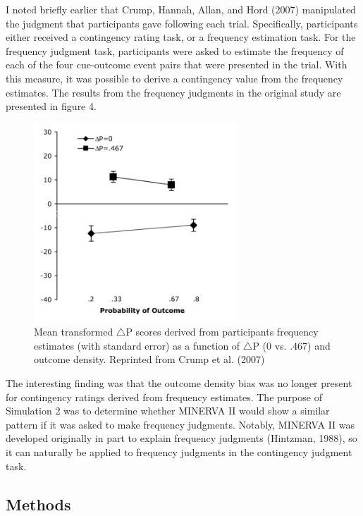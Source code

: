 \documentclass[
  english,
  man,floatsintext]{apa6}
\begin{document}
I noted briefly earlier that Crump, Hannah, Allan, and Hord (2007) manipulated the judgment that participants gave following each trial. Specifically, participants either received a contingency rating task, or a frequency estimation task. For the frequency judgment task, participants were asked to estimate the frequency of each of the four cue-outcome event pairs that were presented in the trial. With this measure, it was possible to derive a contingency value from the frequency estimates. The results from the frequency judgments in the original study are presented in figure 4.

\begin{figure}

{\centering \includegraphics[width=3in]{imgs/crump_frequency_results} 

}

\caption{Mean transformed $\triangle$P scores derived from participants frequency estimates (with standard error) as a function of $\triangle$P (0 vs. .467) and outcome density. Reprinted from Crump et al. (2007)}\label{fig:unnamed-chunk-6}
\end{figure}

The interesting finding was that the outcome density bias was no longer present for contingency ratings derived from frequency estimates. The purpose of Simulation 2 was to determine whether MINERVA II would show a similar pattern if it was asked to make frequency judgments. Notably, MINERVA II was developed originally in part to explain frequency judgments (Hintzman, 1988), so it can naturally be applied to frequency judgments in the contingency judgment task.

\hypertarget{methods-1}{%
\subsection{Methods}\label{methods-1}}
\end{document}
